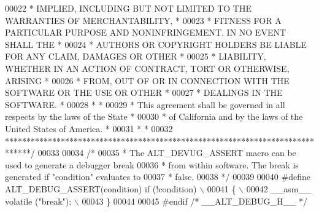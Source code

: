 \begin{DoxyCode}
00022 \textcolor{comment}{* IMPLIED, INCLUDING BUT NOT LIMITED TO THE WARRANTIES OF MERCHANTABILITY,    *}
00023 \textcolor{comment}{* FITNESS FOR A PARTICULAR PURPOSE AND NONINFRINGEMENT. IN NO EVENT SHALL THE *}
00024 \textcolor{comment}{* AUTHORS OR COPYRIGHT HOLDERS BE LIABLE FOR ANY CLAIM, DAMAGES OR OTHER      *}
00025 \textcolor{comment}{* LIABILITY, WHETHER IN AN ACTION OF CONTRACT, TORT OR OTHERWISE, ARISING     *}
00026 \textcolor{comment}{* FROM, OUT OF OR IN CONNECTION WITH THE SOFTWARE OR THE USE OR OTHER         *}
00027 \textcolor{comment}{* DEALINGS IN THE SOFTWARE.                                                   *}
00028 \textcolor{comment}{*                                                                             *}
00029 \textcolor{comment}{* This agreement shall be governed in all respects by the laws of the State   *}
00030 \textcolor{comment}{* of California and by the laws of the United States of America.              *}
00031 \textcolor{comment}{*                                                                             *}
00032 \textcolor{comment}{******************************************************************************/}
00033 
00034 \textcolor{comment}{/*}
00035 \textcolor{comment}{ * The ALT\_DEVUG\_ASSERT macro can be used to generate a debugger break }
00036 \textcolor{comment}{ * from within software. The break is generated if "condition" evaluates to}
00037 \textcolor{comment}{ * false.}
00038 \textcolor{comment}{ */}
00039 
00040 \textcolor{preprocessor}{#define ALT\_DEBUG\_ASSERT(condition) if (!condition) \(\backslash\)}
00041 \textcolor{preprocessor}{\{                                                   \(\backslash\)}
00042 \textcolor{preprocessor}{  \_\_asm\_\_ volatile ("break");                       \(\backslash\)}
00043 \textcolor{preprocessor}{\}}
00044 
00045 \textcolor{preprocessor}{#endif }\textcolor{comment}{/* \_\_ALT\_DEBUG\_H\_\_ */}\textcolor{preprocessor}{}
\end{DoxyCode}
